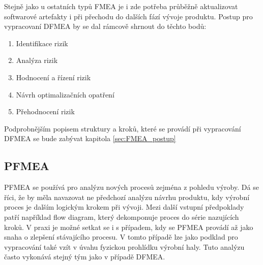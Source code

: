 Stejně jako u ostatních typů FMEA je i zde potřeba průběžně aktualizovat softwarové artefakty i při přechodu do dalších fází vývoje produktu. Postup pro vypracovaní DFMEA by se dal rámcově shrnout do těchto bodů: 
\begin{enumerate}
	\item Identifikace rizik
	\item Analýza rizik
	\item Hodnocení a řízení rizik 
	\item Návrh optimalizačních opatření
	\item Přehodnocení rizik
\end{enumerate}
Podprobnějším popisem struktury a kroků, které se provádí při vypracování DFMEA se bude zabývat kapitola \ref{sec:FMEA_postup}

\subsection{PFMEA}
\label{subsec:PFMEA}
PFMEA se používá pro analýzu nových procesů zejména z pohledu výroby. Dá se říci, že by měla navazovat ne předchozí analýzu návrhu produktu, kdy výrobní proces je dalším logickým krokem při vývoji. Mezi další vstupní předpoklady patří například flow diagram, který dekomponuje proces do série nazujících kroků. V praxi je možné setkat se i s případem, kdy se PFMEA provádí až jako snaha o zlepšení stávajícího procesu. V tomto případě lze jako podklad pro vypracování také vzít v úvahu fyzickou prohlídku výrobní haly. Tuto analýzu často vykonává stejný tým jako v případě DFMEA.  



\endinput